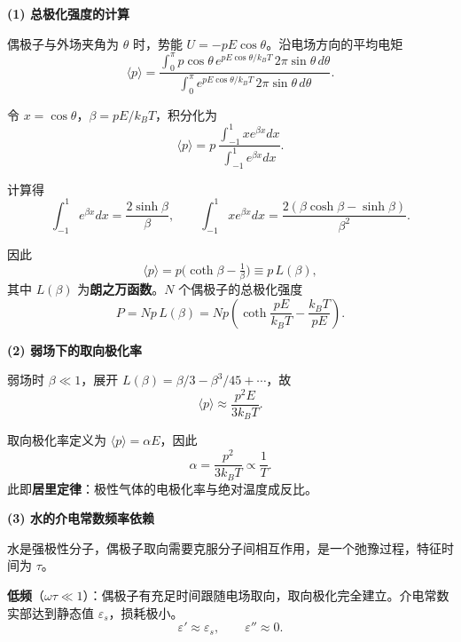 \begin{derivationbox}[标准解题过程]
\textbf{(1) 总极化强度的计算}

偶极子与外场夹角为 $\theta$ 时，势能 $U=-pE\cos\theta$。沿电场方向的平均电矩
\begin{equation}
\langle p\rangle=\frac{\int_0^\pi p\cos\theta\,e^{pE\cos\theta/k_BT}\,2\pi\sin\theta\,d\theta}
{\int_0^\pi e^{pE\cos\theta/k_BT}\,2\pi\sin\theta\,d\theta}.
\end{equation}

令 $x=\cos\theta$，$\beta=pE/k_BT$，积分化为
\begin{equation}
\langle p\rangle=p\,\frac{\int_{-1}^1 xe^{\beta x}dx}{\int_{-1}^1 e^{\beta x}dx}.
\end{equation}

计算得
\begin{equation}
\int_{-1}^1 e^{\beta x}dx=\frac{2\sinh\beta}{\beta},\qquad
\int_{-1}^1 xe^{\beta x}dx=\frac{2(\beta\cosh\beta-\sinh\beta)}{\beta^2}.
\end{equation}

因此
\begin{equation}
\langle p\rangle=p\bigl(\coth\beta-\tfrac{1}{\beta}\bigr)\equiv p\,L(\beta),
\end{equation}
其中 $L(\beta)$ 为\textbf{朗之万函数}。$N$ 个偶极子的总极化强度
\begin{equation}
\boxed{P=Np\,L(\beta)=Np\left(\coth\frac{pE}{k_BT}-\frac{k_BT}{pE}\right).}
\end{equation}

\textbf{(2) 弱场下的取向极化率}

弱场时 $\beta\ll1$，展开 $L(\beta)=\beta/3-\beta^3/45+\cdots$，故
\begin{equation}
\langle p\rangle\approx\frac{p^2E}{3k_BT}.
\end{equation}

取向极化率定义为 $\langle p\rangle=\alpha E$，因此
\begin{equation}
\boxed{\alpha=\frac{p^2}{3k_BT}\propto\frac{1}{T}.}
\end{equation}
此即\textbf{居里定律}：极性气体的电极化率与绝对温度成反比。

\textbf{(3) 水的介电常数频率依赖}

水是强极性分子，偶极子取向需要克服分子间相互作用，是一个弛豫过程，特征时间为 $\tau$。

\textbf{低频}（$\omega\tau\ll1$）：偶极子有充足时间跟随电场取向，取向极化完全建立。介电常数实部达到静态值 $\varepsilon_s$，损耗极小。
\begin{equation}
\varepsilon'\approx\varepsilon_s,\qquad\varepsilon''\approx0.
\end{equation}


\end{derivationbox}
